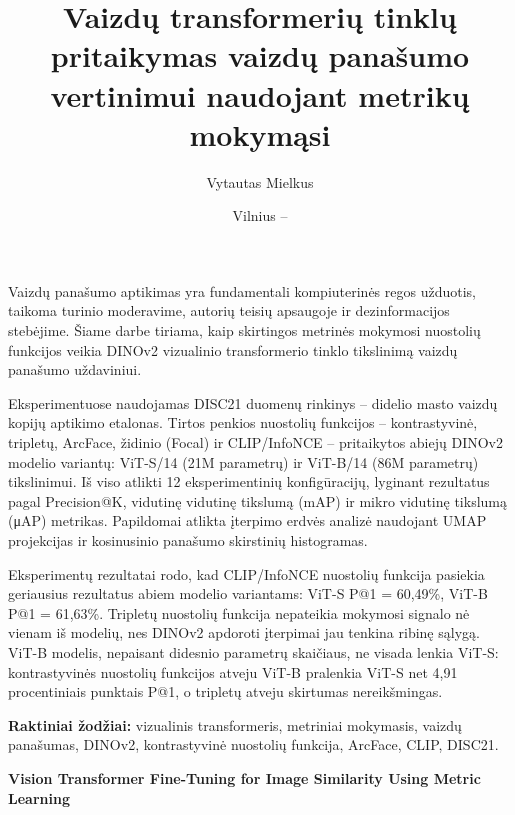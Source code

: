\documentclass[
    english,
]{VUMIFPSbakalaurinis}
\title{Vaizdų transformerių tinklų pritaikymas vaizdų panašumo vertinimui naudojant metrikų mokymąsi}
\author{Vytautas Mielkus}
\date{Vilnius – \the\year}
\begin{document}
\maketitle

\tableofcontents


Vaizdų panašumo aptikimas yra fundamentali kompiuterinės regos užduotis, taikoma turinio moderavime, autorių teisių apsaugoje ir dezinformacijos stebėjime. Šiame darbe tiriama, kaip skirtingos metrinės mokymosi nuostolių funkcijos veikia DINOv2 vizualinio transformerio tinklo tikslinimą vaizdų panašumo uždaviniui.

Eksperimentuose naudojamas DISC21 duomenų rinkinys – didelio masto vaizdų kopijų aptikimo etalonas. Tirtos penkios nuostolių funkcijos – kontrastyvinė, tripletų, ArcFace, židinio (Focal) ir CLIP/InfoNCE – pritaikytos abiejų DINOv2 modelio variantų: ViT-S/14 (21M parametrų) ir ViT-B/14 (86M parametrų) tikslinimui. Iš viso atlikti 12 eksperimentinių konfigūracijų, lyginant rezultatus pagal Precision@K, vidutinę vidutinę tikslumą (mAP) ir mikro vidutinę tikslumą (μAP) metrikas. Papildomai atlikta įterpimo erdvės analizė naudojant UMAP projekcijas ir kosinusinio panašumo skirstinių histogramas.

Eksperimentų rezultatai rodo, kad CLIP/InfoNCE nuostolių funkcija pasiekia geriausius rezultatus abiem modelio variantams: ViT-S P@1 = 60,49\%, ViT-B P@1 = 61,63\%. Tripletų nuostolių funkcija nepateikia mokymosi signalo nė vienam iš modelių, nes DINOv2 apdoroti įterpimai jau tenkina ribinę sąlygą. ViT-B modelis, nepaisant didesnio parametrų skaičiaus, ne visada lenkia ViT-S: kontrastyvinės nuostolių funkcijos atveju ViT-B pralenkia ViT-S net 4,91 procentiniais punktais P@1, o tripletų atveju skirtumas nereikšmingas.

\textbf{Raktiniai žodžiai:} vizualinis transformeris, metriniai mokymasis, vaizdų panašumas, DINOv2, kontrastyvinė nuostolių funkcija, ArcFace, CLIP, DISC21.


\textbf{Vision Transformer Fine-Tuning for Image Similarity Using Metric Learning}
\end{document}
